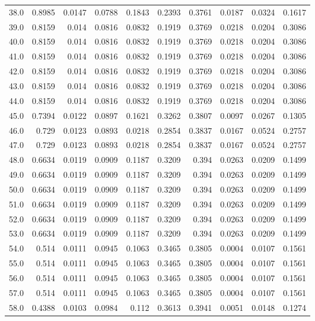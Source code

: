 \begin{longtable}{lrrrrrrrrr}
38.0 & 0.8985 & 0.0147 & 0.0788 & 0.1843 & 0.2393 & 0.3761 & 0.0187 & 0.0324 & 0.1617 \\
39.0 & 0.8159 & 0.014 & 0.0816 & 0.0832 & 0.1919 & 0.3769 & 0.0218 & 0.0204 & 0.3086 \\
40.0 & 0.8159 & 0.014 & 0.0816 & 0.0832 & 0.1919 & 0.3769 & 0.0218 & 0.0204 & 0.3086 \\
41.0 & 0.8159 & 0.014 & 0.0816 & 0.0832 & 0.1919 & 0.3769 & 0.0218 & 0.0204 & 0.3086 \\
42.0 & 0.8159 & 0.014 & 0.0816 & 0.0832 & 0.1919 & 0.3769 & 0.0218 & 0.0204 & 0.3086 \\
43.0 & 0.8159 & 0.014 & 0.0816 & 0.0832 & 0.1919 & 0.3769 & 0.0218 & 0.0204 & 0.3086 \\
44.0 & 0.8159 & 0.014 & 0.0816 & 0.0832 & 0.1919 & 0.3769 & 0.0218 & 0.0204 & 0.3086 \\
45.0 & 0.7394 & 0.0122 & 0.0897 & 0.1621 & 0.3262 & 0.3807 & 0.0097 & 0.0267 & 0.1305 \\
46.0 & 0.729 & 0.0123 & 0.0893 & 0.0218 & 0.2854 & 0.3837 & 0.0167 & 0.0524 & 0.2757 \\
47.0 & 0.729 & 0.0123 & 0.0893 & 0.0218 & 0.2854 & 0.3837 & 0.0167 & 0.0524 & 0.2757 \\
48.0 & 0.6634 & 0.0119 & 0.0909 & 0.1187 & 0.3209 & 0.394 & 0.0263 & 0.0209 & 0.1499 \\
49.0 & 0.6634 & 0.0119 & 0.0909 & 0.1187 & 0.3209 & 0.394 & 0.0263 & 0.0209 & 0.1499 \\
50.0 & 0.6634 & 0.0119 & 0.0909 & 0.1187 & 0.3209 & 0.394 & 0.0263 & 0.0209 & 0.1499 \\
51.0 & 0.6634 & 0.0119 & 0.0909 & 0.1187 & 0.3209 & 0.394 & 0.0263 & 0.0209 & 0.1499 \\
52.0 & 0.6634 & 0.0119 & 0.0909 & 0.1187 & 0.3209 & 0.394 & 0.0263 & 0.0209 & 0.1499 \\
53.0 & 0.6634 & 0.0119 & 0.0909 & 0.1187 & 0.3209 & 0.394 & 0.0263 & 0.0209 & 0.1499 \\
54.0 & 0.514 & 0.0111 & 0.0945 & 0.1063 & 0.3465 & 0.3805 & 0.0004 & 0.0107 & 0.1561 \\
55.0 & 0.514 & 0.0111 & 0.0945 & 0.1063 & 0.3465 & 0.3805 & 0.0004 & 0.0107 & 0.1561 \\
56.0 & 0.514 & 0.0111 & 0.0945 & 0.1063 & 0.3465 & 0.3805 & 0.0004 & 0.0107 & 0.1561 \\
57.0 & 0.514 & 0.0111 & 0.0945 & 0.1063 & 0.3465 & 0.3805 & 0.0004 & 0.0107 & 0.1561 \\
58.0 & 0.4388 & 0.0103 & 0.0984 & 0.112 & 0.3613 & 0.3941 & 0.0051 & 0.0148 & 0.1274 \\

\end{longtable}
